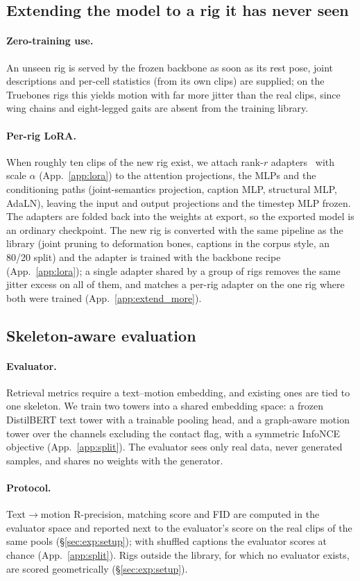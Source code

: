 \subsection{Extending the model to a rig it has never seen}\label{sec:method:lora}
\paragraph{Zero-training use.} An unseen rig is served by the frozen backbone as soon as its rest
pose, joint descriptions and per-cell statistics (from its own clips) are supplied; on the Truebones
rigs this yields motion with far more jitter than the real clips, since wing chains and eight-legged
gaits are absent from the training library.

\paragraph{Per-rig LoRA.} When roughly ten clips of the new rig exist, we attach rank-$r$
adapters~\citep{hu2022lora} with scale $\alpha$ (App.~\ref{app:lora}) to the attention projections, the MLPs
and the conditioning paths (joint-semantics projection, caption MLP, structural MLP, AdaLN), leaving the
input and output projections and the timestep MLP frozen. The adapters are folded back into the weights at
export, so the exported model is an ordinary checkpoint. The new rig is converted with the same pipeline as
the library (joint pruning to deformation bones, captions in the corpus style, an 80/20 split) and the
adapter is trained with the backbone recipe (App.~\ref{app:lora}); a single adapter shared by a group of rigs
removes the same jitter excess on all of them, and matches a per-rig adapter on the one rig where both were
trained (App.~\ref{app:extend_more}).

\subsection{Skeleton-aware evaluation}\label{sec:method:eval}
\paragraph{Evaluator.} Retrieval metrics require a text--motion embedding, and existing ones are
tied to one skeleton. We train two towers into a shared embedding space: a frozen DistilBERT text tower
with a trainable pooling head, and a graph-aware motion tower over the \rep{} channels excluding the
contact flag, with a symmetric InfoNCE objective (App.~\ref{app:split}). The evaluator sees only real data,
never generated samples, and shares no weights with the generator.

\paragraph{Protocol.} Text$\to$motion R-precision, matching score and FID are computed in the evaluator
space and reported next to the evaluator's score on the real clips of the same pools (\S\ref{sec:exp:setup});
with shuffled captions the evaluator scores at chance (App.~\ref{app:split}). Rigs outside the library, for
which no evaluator exists, are scored geometrically (\S\ref{sec:exp:setup}).

